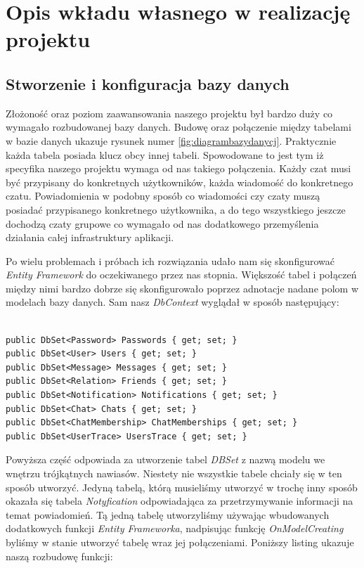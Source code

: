 \documentclass[12pt,a4paper]{article}
\begin{document}
\section{Opis wkładu własnego w realizację projektu}

\subsection{Stworzenie i konfiguracja bazy danych}

\hspace*{0.7cm} Złożoność oraz poziom zaawansowania naszego projektu był bardzo duży co wymagało rozbudowanej bazy danych. Budowę oraz połączenie między tabelami w bazie danych ukazuje rysunek numer \ref{fig:diagrambazydanycj}. Praktycznie każda tabela posiada klucz obcy innej tabeli. Spowodowane to jest tym iż specyfika naszego projektu wymaga od nas takiego połączenia. Każdy czat musi być przypisany do konkretnych użytkowników, każda wiadomość do konkretnego czatu. Powiadomienia w podobny sposób co wiadomości czy czaty muszą posiadać przypisanego konkretnego użytkownika, a do tego wszystkiego jeszcze dochodzą czaty grupowe co wymagało od nas dodatkowego przemyślenia działania całej infrastruktury aplikacji.\newline

\hspace*{0.7cm} Po wielu problemach i próbach ich rozwiązania udało nam się skonfigurować \textit{Entity Framework} do oczekiwanego przez nas stopnia. Większość tabel i połączeń między nimi bardzo dobrze się skonfigurowało poprzez adnotacje nadane polom w modelach bazy danych. Sam nasz \textit{DbContext} wyglądał w sposób następujący:\newline

\begin{lstlisting}[caption={DbContext Entity Framework}]

public DbSet<Password> Passwords { get; set; }
public DbSet<User> Users { get; set; }
public DbSet<Message> Messages { get; set; }
public DbSet<Relation> Friends { get; set; }
public DbSet<Notification> Notifications { get; set; }
public DbSet<Chat> Chats { get; set; }
public DbSet<ChatMembership> ChatMemberships { get; set; }
public DbSet<UserTrace> UsersTrace { get; set; }

\end{lstlisting}

\hspace*{0.7cm} Powyższa część odpowiada za utworzenie tabel \textit{DBSet} z nazwą modelu we wnętrzu trójkątnych nawiasów. Niestety nie wszystkie tabele chciały się w ten sposób utworzyć. Jedyną tabelą, którą musieliśmy utworzyć w trochę inny sposób okazała się tabela \textit{Notyfication} odpowiadająca za przetrzymywanie informacji na temat powiadomień. Tą jedną tabelę utworzyliśmy używając wbudowanych dodatkowych funkcji \textit{Entity Frameworka}, nadpisując funkcję \textit{OnModelCreating} byliśmy w stanie utworzyć tabelę wraz jej połączeniami. Poniższy listing ukazuje naszą rozbudowę funkcji:\newline
\end{document}
